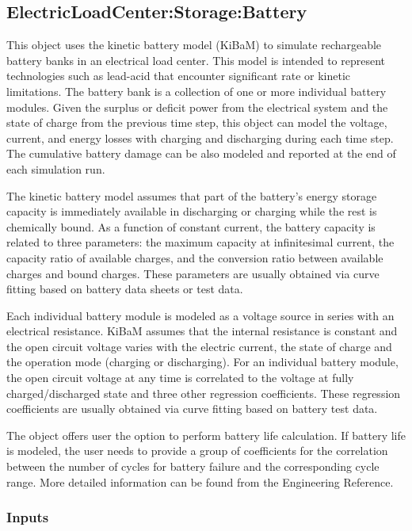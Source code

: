 \subsection{ElectricLoadCenter:Storage:Battery}\label{electricloadcenterstorage-battery}

This object uses the kinetic battery model (KiBaM) to simulate rechargeable battery banks in an electrical load center. This model is intended to represent technologies such as lead-acid that encounter significant rate or kinetic limitations. The battery bank is a collection of one or more individual battery modules. Given the surplus or deficit power from the electrical system and the state of charge from the previous time step, this object can model the voltage, current, and energy losses with charging and discharging during each time step. The cumulative battery damage can be also modeled and reported at the end of each simulation run.

The kinetic battery model assumes that part of the battery's energy storage capacity is immediately available in discharging or charging while the rest is chemically bound. As a function of constant current, the battery capacity is related to three parameters: the maximum capacity at infinitesimal current, the capacity ratio of available charges, and the conversion ratio between available charges and bound charges. These parameters are usually obtained via curve fitting based on battery data sheets or test data.

Each individual battery module is modeled as a voltage source in series with an electrical resistance. KiBaM assumes that the internal resistance is constant and the open circuit voltage varies with the electric current, the state of charge and the operation mode (charging or discharging). For an individual battery module, the open circuit voltage at any time is correlated to the voltage at fully charged/discharged state and three other regression coefficients. These regression coefficients are usually obtained via curve fitting based on battery test data.

The object offers user the option to perform battery life calculation. If battery life is modeled, the user needs to provide a group of coefficients for the correlation between the number of cycles for battery failure and the corresponding cycle range. More detailed information can be found from the Engineering Reference.

\subsubsection{Inputs}

